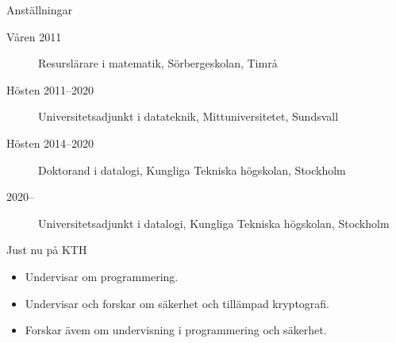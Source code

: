 \begin{frame}
  \begin{block}{Anställningar}
    \begin{description}
      \item[Våren 2011] Resurslärare i matematik, Sörbergeskolan, Timrå
      \item[Hösten 2011--2020] Universitetsadjunkt i datateknik, 
        Mittuniversitetet, Sundsvall
      \item[Hösten 2014--2020] Doktorand i datalogi, Kungliga Tekniska 
        högskolan, Stockholm
      \item[2020--] Universitetsadjunkt i datalogi, Kungliga Tekniska 
        högskolan, Stockholm
    \end{description}
  \end{block}

  \begin{exampleblock}{Just nu på KTH}
    \begin{itemize}
      \item Undervisar om programmering.
      \item Undervisar och forskar om säkerhet och tillämpad kryptografi.
      \item Forskar ävem om undervisning i programmering och säkerhet.
    \end{itemize}
  \end{exampleblock}
\end{frame}

